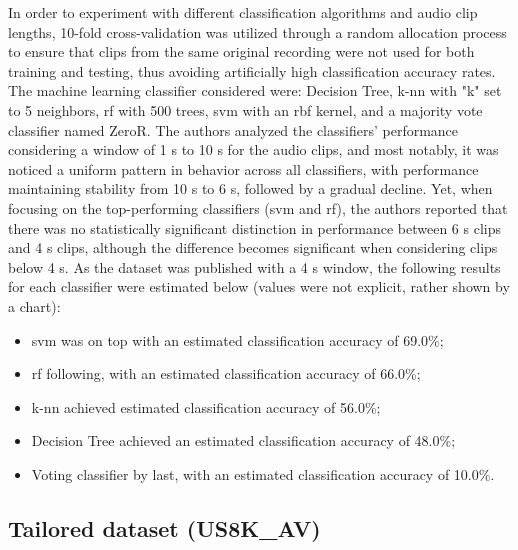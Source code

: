 In order to experiment with different classification algorithms and audio clip lengths, 10-fold cross-validation was utilized through a random allocation process to ensure that clips from the same original recording were not used for both training and testing, thus avoiding artificially high classification accuracy rates. The machine learning classifier considered were: Decision Tree, \gls{k-nn} with "k" set to 5 neighbors, \gls{rf} with 500 trees, \gls{svm} with an \gls{rbf} kernel, and a majority vote classifier named ZeroR. The authors analyzed the classifiers' performance considering a window of 1 \gls{s} to 10 \gls{s} for the audio clips, and most notably, it was noticed a uniform pattern in behavior across all classifiers, with performance maintaining stability from 10 \gls{s} to 6 \gls{s}, followed by a gradual decline. Yet, when focusing on the top-performing classifiers (\gls{svm} and \gls{rf}), the authors reported that there was no statistically significant distinction in performance between 6 \gls{s} clips and 4 \gls{s} clips, although the difference becomes significant when considering clips below 4 \gls{s}. As the dataset was published with a 4 \gls{s} window, the following results for each classifier were estimated below (values were not explicit, rather shown by a chart):

\begin{itemize}
    \item \gls{svm} was on top with an estimated classification accuracy of 69.0\%;
    \item \gls{rf} following, with an estimated classification accuracy of 66.0\%;
    \item \gls{k-nn} achieved estimated classification accuracy of 56.0\%;
    \item Decision Tree achieved an estimated classification accuracy of 48.0\%;
    \item Voting classifier by last, with an estimated classification accuracy of 10.0\%. 
\end{itemize}


\subsection{Tailored dataset (US8K\_AV)}
\label{subsec:dataset_US8K_AV}

